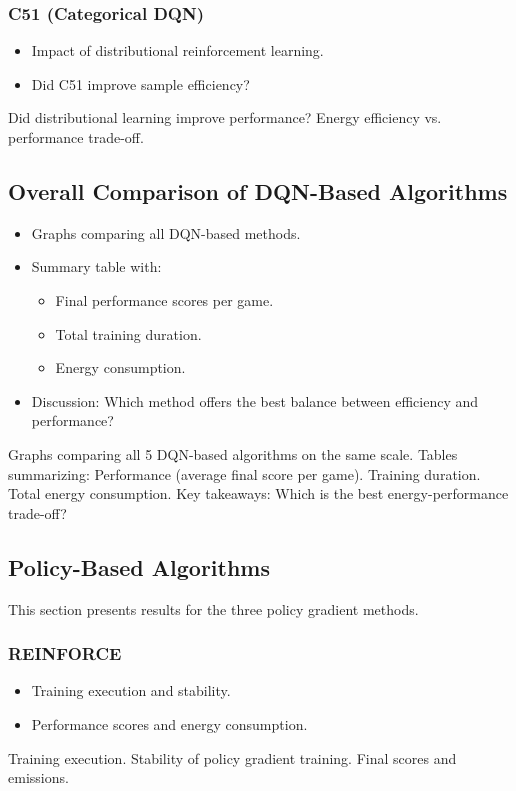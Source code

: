 \subsubsection{C51 (Categorical DQN)}
\begin{itemize}
	\item Impact of distributional reinforcement learning.
	\item Did C51 improve sample efficiency?
\end{itemize}
Did distributional learning improve performance?
Energy efficiency vs. performance trade-off.


\subsection{Overall Comparison of DQN-Based Algorithms}
\begin{itemize}
	\item Graphs comparing all DQN-based methods.
	\item Summary table with:
	\begin{itemize}
		\item Final performance scores per game.
		\item Total training duration.
		\item Energy consumption.
	\end{itemize}
	\item Discussion: Which method offers the best balance between efficiency and performance?
\end{itemize}
Graphs comparing all 5 DQN-based algorithms on the same scale.
Tables summarizing:
Performance (average final score per game).
Training duration.
Total energy consumption.
Key takeaways: Which is the best energy-performance trade-off?

\subsection{Policy-Based Algorithms}
This section presents results for the three policy gradient methods.

\subsubsection{REINFORCE}
\begin{itemize}
	\item Training execution and stability.
	\item Performance scores and energy consumption.
\end{itemize}
Training execution.
Stability of policy gradient training.
Final scores and emissions.


